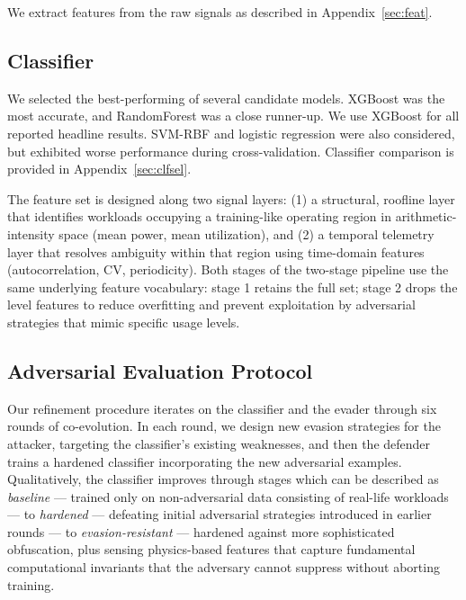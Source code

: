 We extract features from the raw signals as described in Appendix~\ref{sec:feat}.

\subsection{Classifier}

We selected the best-performing of several candidate models. XGBoost \citep{chen2016} was the most accurate, and RandomForest \citep{breiman2001} was a close runner-up. We use XGBoost for all reported headline results. SVM-RBF and logistic regression were also considered, but exhibited worse performance during cross-validation. Classifier comparison is provided in Appendix~\ref{sec:clfsel}.

The feature set is designed along two signal layers: (1) a structural, roofline \citep{williams2009} layer that identifies workloads occupying a training-like operating region in arithmetic-intensity space (mean power, mean utilization), and (2) a temporal telemetry layer that resolves ambiguity within that region using time-domain features (autocorrelation, CV, periodicity). Both stages of the two-stage pipeline use the same underlying feature vocabulary: stage 1 retains the full set; stage 2 drops the level features to reduce overfitting and prevent exploitation by adversarial strategies that mimic specific usage levels.

\subsection{Adversarial Evaluation Protocol}

Our refinement procedure iterates on the classifier and the evader through six rounds of co-evolution. In each round, we design new evasion strategies for the attacker, targeting the classifier's existing weaknesses, and then the defender trains a hardened classifier incorporating the new adversarial examples. Qualitatively, the classifier improves through stages which can be described as \emph{baseline} --- trained only on non-adversarial data consisting of real-life workloads --- to \emph{hardened} --- defeating initial adversarial strategies introduced in earlier rounds --- to \emph{evasion-resistant} --- hardened against more sophisticated obfuscation, plus sensing physics-based features that capture fundamental computational invariants that the adversary cannot suppress without aborting training.


